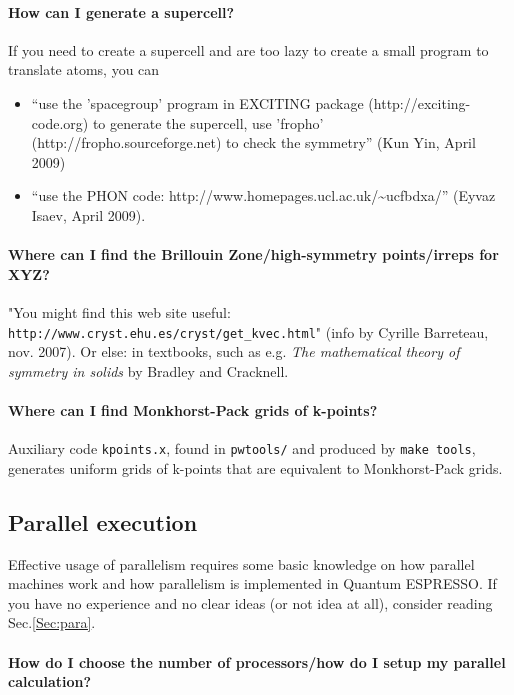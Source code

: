 \documentclass[12pt,a4paper]{article}
\def\qe{{\sc Quantum ESPRESSO}}
\begin{document}
\paragraph{How can I generate a supercell?}

If you need to create a supercell and are too lazy to create a 
small program to translate atoms, you can
\begin{itemize}
\item ``use the 'spacegroup' program in EXCITING package 
(http://exciting-code.org) to generate the supercell,
use 'fropho' (http://fropho.sourceforge.net) to check the symmetry''
(Kun Yin, April 2009)
\item ``use the PHON code: http://www.homepages.ucl.ac.uk/\~{}ucfbdxa/''
(Eyvaz Isaev, April 2009).
\end{itemize}

\paragraph{Where can I find the Brillouin Zone/high-symmetry
  points/irreps for XYZ?} 

"You might find this web site useful:
\texttt{http://www.cryst.ehu.es/cryst/get\_kvec.html}" (info by Cyrille
Barreteau, nov. 2007). Or else: in textbooks, such as e.g. {\em The
mathematical theory of symmetry in solids} by Bradley and Cracknell.

\paragraph{Where can I find Monkhorst-Pack grids of k-points?}

Auxiliary code \texttt{kpoints.x}, found in \texttt{pwtools/} and 
produced by \texttt{make tools}, generates uniform grids of k-points 
that are equivalent to Monkhorst-Pack grids. 



\subsection{Parallel execution}

Effective usage of parallelism requires some basic knowledge on how
parallel machines work and how parallelism is implemented in
\qe. If you have no experience and no clear ideas (or not
idea at all), consider reading Sec.\ref{Sec:para}.

\paragraph{How do I choose the number of processors/how do I setup my parallel calculation?}
\end{document}
